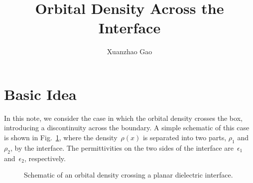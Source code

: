 \documentclass[prb,amsmath,amssymb, 10pt]{revtex4}
\begin{document}

\title{Orbital Density Across the Interface}
\author{Xuanzhao Gao}

\maketitle

\section{Basic Idea}

In this note, we consider the case in which the orbital density crosses the box, introducing a discontinuity across the boundary.
A simple schematic of this case is shown in Fig.~\ref{fig:orbital_cross_interface}, where the density~$\rho(x)$ is separated into two parts, $\rho_1$ and $\rho_2$, by the interface. The permittivities on the two sides of the interface are~$\epsilon_1$ and~$\epsilon_2$, respectively.

\begin{figure}[htbp]
    \centering
    \caption{Schematic of an orbital density crossing a planar dielectric interface.}
    \label{fig:orbital_cross_interface}
\end{figure}
\end{document}
